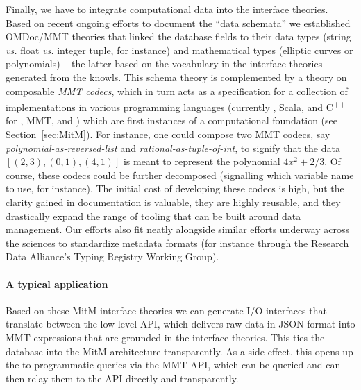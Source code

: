 Finally, we have to integrate computational data into the interface theories. Based on
recent ongoing efforts \cite{lmfdb-formats} to document the \LMFDB ``data schemata'' we
established OMDoc/MMT theories that linked the database fields to their data types (string
\emph{vs.} float \emph{vs.} integer tuple, for instance) and mathematical types (elliptic
curves or polynomials) -- the latter based on the vocabulary in the interface theories
generated from the \LMFDB knowls. This schema theory is complemented by a theory on
composable \emph{MMT codecs}, which in turn acts as a specification for a collection of
implementations in various programming languages (currently \Python, Scala, and
C\textsuperscript{++} for \Sage, MMT, and \GAP{}) which are first instances of a computational
foundation (see Section~\ref{sec:MitM}).  For instance, one could compose two MMT codecs,
say \emph{polynomial-as-reversed-list} and \emph{rational-as-tuple-of-int}, to signify
that the data $[(2,3),(0,1),(4,1)]$ is meant to represent the polynomial $4x^2+2/3$. Of
course, these codecs could be further decomposed (signalling which variable name to use,
for instance). The initial cost of developing these codecs is high, but the clarity
gained in documentation is valuable, they are highly reusable, and they drastically expand
the range of tooling that can be built around data management. Our efforts also fit neatly
alongside similar efforts underway across the sciences to standardize metadata formats
(for instance through the Research Data Alliance's Typing Registry Working
Group\cite{rda-typing}).

\paragraph{A typical application}
Based on these MitM interface theories we can generate I/O interfaces that translate
between the low-level \LMFDB API, which delivers raw \Mongo data in JSON format into MMT
expressions that are grounded in the interface theories. This ties the \LMFDB database
into the MitM architecture transparently. As a side effect, this opens up the \LMFDB to
programmatic queries via the MMT API, which can be queried and can then relay them to the
\LMFDB API directly and transparently.


